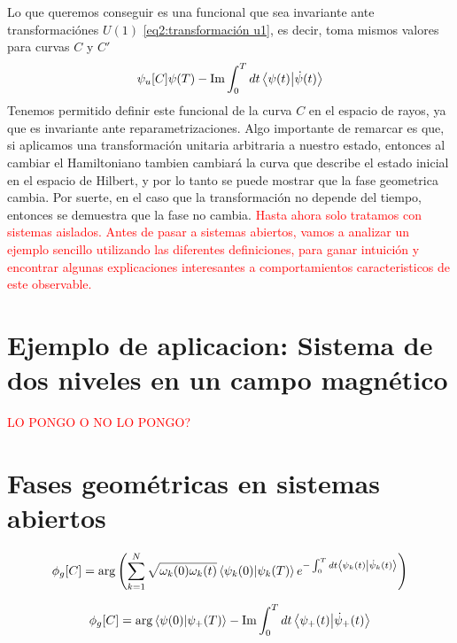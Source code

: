 Lo que queremos conseguir es una funcional que sea invariante ante transformaciónes $U(1)$ \ref{eq2:transformación u1}, es decir, toma mismos valores para curvas $C$ y $C'$
\begin{equation} \label{eq2:fg cinematica unitaria}
    \psi_u[C] \def \arg \braket{\psi(0)}{\psi(T)} - \Im \int_0^T dt \braket{\psi(t)}{\dot \psi(t)}
\end{equation}
Tenemos permitido definir este funcional de la curva $C$ en el espacio de rayos, ya que es invariante ante reparametrizaciones. Algo importante de remarcar es que, si aplicamos una transformación unitaria arbitraria a nuestro estado, entonces al cambiar el Hamiltoniano tambien cambiará la curva que describe el estado inicial en el espacio de Hilbert, y por lo tanto se puede mostrar que la fase geometrica cambia. Por suerte, en el caso que la transformación no depende del tiempo, entonces se demuestra que la fase no cambia. 
\newline
\textcolor{red}{Hasta ahora solo tratamos con sistemas aislados. Antes de pasar a sistemas abiertos, vamos a analizar un ejemplo sencillo utilizando las diferentes definiciones, para ganar intuición y encontrar algunas explicaciones interesantes a comportamientos caracteristicos de este observable.}

\section{Ejemplo de aplicacion: Sistema de dos niveles en un campo magn\'etico}\label{sec2:ejemplos}

\textcolor{red}{LO PONGO O NO LO PONGO?}

\section{Fases geométricas en sistemas abiertos}\label{sec2:sistemas abiertos}

\begin{equation}
    \phi_g[C]=\arg \left( \sum_{k=1}^{N} \sqrt{\omega_k(0)\omega_k(t)} \braket{\psi_k(0)}{\psi_k(T)}e^{-\int_{0}^{T}dt\braket{\psi_k(t)}{\dot\psi_k(t)}} \right)
\end{equation}\label{ec2:fg general}

\begin{equation}
    \phi_g[C]=\arg{\braket{\psi(0)}{\psi_+(T)}}-\Im \int_{0}^{T}dt \braket{\psi_+(t)}{\dot\psi_+(t)}
\end{equation}\label{ec2:fg general puro}


